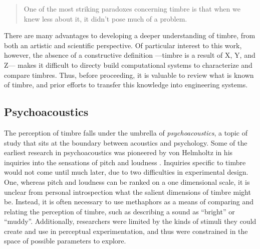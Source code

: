 \begin{quote}
One of the most striking paradoxes concerning timbre is that when we knew less about it, it didn’t pose much of a problem.
\end{quote}

There are many advantages to developing a deeper understanding of timbre, from both an artistic and scientific perspective.
Of particular interest to this work, however, the absence of a constructive definition ---timbre is a result of X, Y, and Z--- makes it difficult to directy build computational systems to characterize and compare timbres.
Thus, before proceeding, it is valuable to review what is known of timbre, and prior efforts to transfer this knowledge into engineering systems.


\subsection{Psychoacoustics}
The perception of timbre falls under the umbrella of \emph{psychoacoustics}, a topic of study that sits at the boundary between acoustics and psychology.
Some of the earliest research in psychoacoustics was pioneered by von Helmholtz in his inquiries into the sensations of pitch and loudness \cite{Cook1995?}.
Inquiries specific to timbre would not come until much later, due to two difficulties in experimental design.
One, whereas pitch and loudness can be ranked on a one dimensional scale, it is unclear from personal introspection what the salient dimensions of timbre might be.
Instead, it is often necessary to use methaphors as a means of comparing and relating the perception of timbre, such as describing a sound as ``bright'' or ``muddy''.
Additionally, researchers were limited by the kinds of stimuli they could create and use in perceptual experimentation, and thus were constrained in the space of possible parameters to explore.

